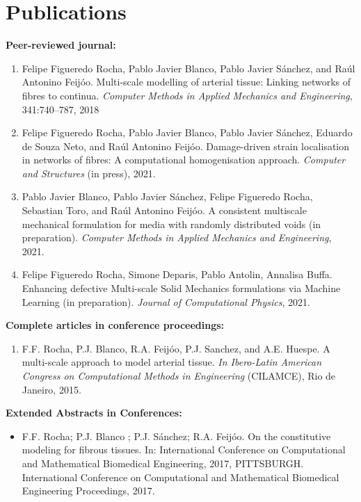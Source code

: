 \documentclass[11pt,letterpaper]{twentysecondcv} %
\begin{document}
\section{Publications}
\item \textbf{Peer-reviewed journal:}
\begin{enumerate}
\item Felipe Figueredo Rocha, Pablo Javier Blanco, Pablo Javier Sánchez, and Raúl Antonino Feijóo. Multi-scale modelling of arterial tissue: Linking networks of fibres to continua. \textit{Computer Methods in Applied Mechanics and Engineering}, 341:740–787, 2018
\item Felipe Figueredo Rocha, Pablo Javier Blanco, Pablo Javier Sánchez, Eduardo de Souza Neto, and Raúl Antonino Feijóo. Damage-driven strain localisation in networks of fibres: A computational homogenisation approach. \textit{Computer and Structures} (in press), 2021.
\item Pablo Javier Blanco, Pablo Javier Sánchez, Felipe Figueredo Rocha, Sebastian Toro, and Raúl Antonino Feijóo. A consistent multiscale mechanical formulation for media with randomly distributed voids (in preparation). \textit{Computer Methods in Applied Mechanics and Engineering}, 2021.
\item Felipe Figueredo Rocha, Simone Deparis, Pablo Antolin, Annalisa Buffa.  Enhancing defective Multi-scale Solid Mechanics formulations via Machine Learning (in preparation). \textit{Journal of Computational Physics}, 2021.

\end{enumerate}	
\vskip -0.1cm
\item \textbf{Complete articles in conference proceedings:} 
\begin{enumerate}
	\item F.F. Rocha, P.J. Blanco, R.A. Feijóo, P.J. Sanchez, and A.E. Huespe. A multi-scale approach to model arterial tissue. \textit{In Ibero-Latin American Congress on Computational Methods in Engineering} (CILAMCE), Rio
	de Janeiro, 2015.
\end{enumerate}	
\vskip -0.1cm
\item \textbf{Extended Abstracts in Conferences:}
\begin{itemize}
\item F.F. Rocha; P.J. Blanco ; P.J. Sánchez; R.A. Feijóo. On the constitutive modeling for fibrous tissues. In: International Conference on Computational and Mathematical Biomedical Engineering, 2017, PITTSBURGH. International Conference on Computational and Mathematical Biomedical Engineering Proceedings, 2017.
\end{itemize}
\end{document}
